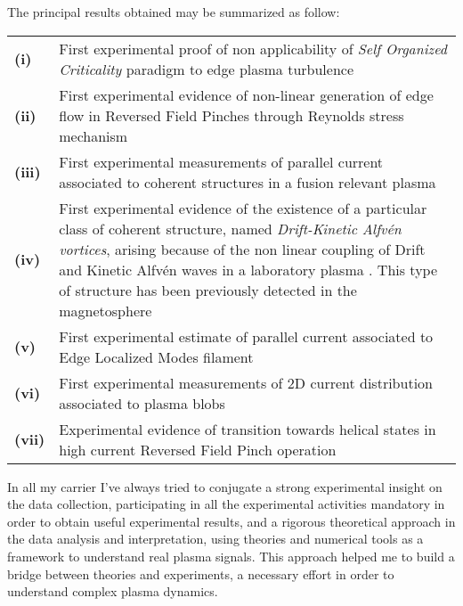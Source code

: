 The principal results obtained may be summarized as
follow:
\begin{longtable}{>{\bfseries}l p{17cm}}
(i) &  First experimental proof of non applicability of \emph{Self
    Organized Criticality} paradigm to edge plasma
  turbulence \parencite{Spada:2001p3574,Antoni:2001p3221} \\
(ii) &  First experimental evidence of non-linear generation of edge
  flow in Reversed Field Pinches through Reynolds stress
  mechanism \parencite{Vianello:2005p1976,Vianello:2005p2671} \\
(iii) & First experimental measurements of parallel current associated
  to coherent structures in a fusion relevant plasma \parencite{Spolaore:2009p4115} \\
(iv) & First experimental evidence of the existence of a particular 
  class of coherent structure, named \emph{Drift-Kinetic Alfv\'en
    vortices}, arising because of the non linear coupling of Drift and
  Kinetic Alfv\'en waves in a laboratory plasma \parencite{Vianello:2010p4670}. This type of structure has been
  previously detected in the magnetosphere \\
(v) &  First experimental estimate of parallel current associated to
  Edge Localized Modes filament \parencite{PhysRevLett.106.125002} \\
(vi) & First experimental measurements of 2D current distribution
associated to plasma blobs \parencite{Furno:2011cs} \\
(vii) & Experimental evidence of transition towards helical states in
high current Reversed Field Pinch
operation \parencite{Lorenzini:2009p4248} \\
\end{longtable}

In all my carrier I've always tried to conjugate a strong experimental
insight on the data collection, participating in all the experimental
activities mandatory in order to obtain useful experimental results, and a rigorous theoretical approach in
the data analysis and interpretation, using theories and numerical
tools as a framework to understand real plasma signals. This
approach helped me to build a bridge between theories and experiments,
a necessary effort in order to understand complex plasma dynamics.
